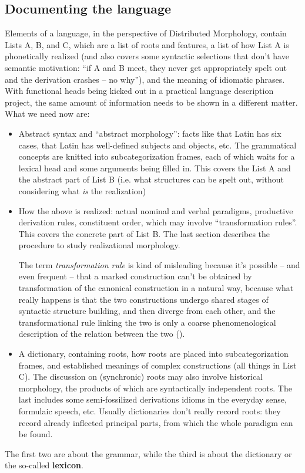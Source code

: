 \documentclass[a4paper, oneside, 12pt]{report}
\newcommand*{\concept}[1]{\textbf{#1}}
\newcommand*{\term}[1]{\emph{#1}}
\begin{document}
{\subsection{Documenting the language}

Elements of a language, in the perspective of Distributed Morphology,
contain Lists A, B, and C, 
which are a list of roots and features, 
a list of how List A is phonetically realized 
(and also covers some syntactic selections that don't have semantic motivation: 
``if A and B meet, they never get appropriately spelt out and the derivation crashes -- no why''),
and the meaning of idiomatic phrases. 
With functional heads being kicked out in a practical language description project, 
the same amount of information needs to be shown in a different matter. 
What we need now are: 
\begin{itemize}
    \item Abstract syntax and ``abstract morphology'':
        facts like that Latin has six cases, 
        that Latin has well-defined subjects and objects, etc. 
        The grammatical concepts are knitted into subcategorization frames,
        each of which waits for a lexical head 
        and some arguments being filled in. 
        This covers the List A and the abstract part of List B 
        (i.e. what structures can be spelt out, 
        without considering what \emph{is} the realization)
    \item How the above is realized: 
        actual nominal and verbal paradigms, 
        productive derivation rules, 
        constituent order, which may involve ``transformation rules''.
        This covers 
        the concrete part of List B. 
        The last section describes the procedure to study realizational morphology.

        The term \term{transformation rule} is kind of misleading 
        because it's possible -- and even frequent -- 
        that a marked construction can't be obtained by transformation 
        of the canonical construction
        in a natural way, 
        because what really happens is 
        that the two constructions undergo shared stages of syntactic structure building,
        and then diverge from each other,
        and the transformational rule linking the two 
        is only a coarse phenomenological description of the relation between the two 
        ().
    \item A dictionary, 
        containing roots, how roots are placed into subcategorization frames, 
        and established meanings of complex constructions (all things in List C). 
        The discussion on (synchronic) roots may also involve 
        historical morphology,
        the products of which are syntactically independent roots.
        The last includes some semi-fossilized derivations 
        idioms in the everyday sense, formulaic speech, etc. 
        Usually dictionaries don't really record roots: 
        they record already inflected principal parts,
        from which the whole paradigm can be found.
\end{itemize}
The first two are about the grammar, 
while the third is about the dictionary
or the so-called \concept{lexicon}.

}
\end{document}
